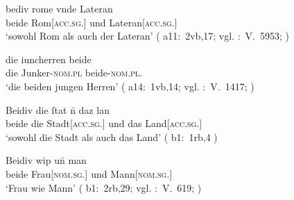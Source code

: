 \begin{exe}
\ex \label{ex:beidkcalem}
	\begin{xlist}
	\ex \gll bediv rome vnde Lateran \\ %
		     beide Rom[\textsc{acc.sg.\NeutI}] und
		     Lateran[\textsc{acc.sg.\MascI}] \\
		\trans `sowohl Rom als auch der Lateran'
			(%
				a11:~2vb,17; vgl.
				\KC:~V.~5953;
				\cite[191]{schroeder1895}%
			)

	\ex \gll die iuncherren beide \\ %
		     die Junker-\textsc{nom.pl} beide-\textsc{nom.pl.\MascM} \\
		\trans `die beiden jungen Herren'
			(%
				a14:~1vb,14; vgl.
				\KC:~V.~1417;
				\cite[107]{schroeder1895}%
			)

	\ex \gll Beidiv die ſtat n̄ daz lan \\ %
		     beide die Stadt[\textsc{acc.sg.\FemI}] und das
		     Land[\textsc{acc.sg.\NeutI}] \\
		\trans `sowohl die Stadt als auch das Land'
			(%
				b1:~1rb,4%
			)

	\ex \gll Beidiv wip un̄ man \\ %
		     beide Frau[\textsc{nom.sg.\NeutF}] und
		     Mann[\textsc{nom.sg.\MascM}] \\
		\trans `Frau wie Mann'
			(%
				b1:~2rb,29; vgl.
				\KC:~V.~619;
				\cite[92]{schroeder1895}%
			)
\end{xlist}
\end{exe}
